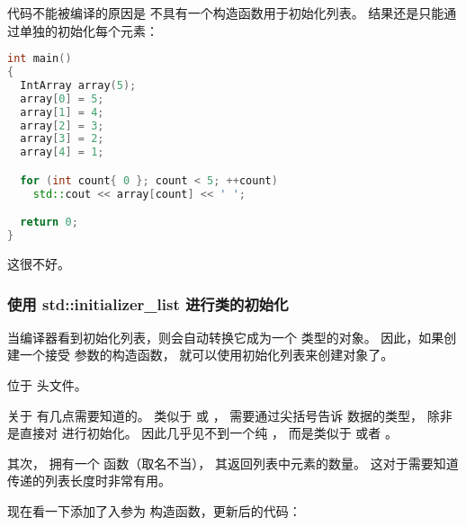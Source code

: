 \documentclass[../../LearnCpp.tex]{subfiles}
\begin{document}
代码不能被编译的原因是  不具有一个构造函数用于初始化列表。
结果还是只能通过单独的初始化每个元素：

\begin{lstlisting}[language=C++]
int main()
{
  IntArray array(5);
  array[0] = 5;
  array[1] = 4;
  array[2] = 3;
  array[3] = 2;
  array[4] = 1;

  for (int count{ 0 }; count < 5; ++count)
    std::cout << array[count] << ' ';

  return 0;
}
\end{lstlisting}

这很不好。

\subsubsection*{使用 std::initializer\_list 进行类的初始化}

当编译器看到初始化列表，则会自动转换它成为一个  类型的对象。
因此，如果创建一个接受  参数的构造函数，
就可以使用初始化列表来创建对象了。

 位于  头文件。

关于  有几点需要知道的。
类似于  或 ，
需要通过尖括号告诉  数据的类型，
除非是直接对  进行初始化。
因此几乎见不到一个纯 ，
而是类似于  或者 。

其次， 拥有一个  函数（取名不当），
其返回列表中元素的数量。
这对于需要知道传递的列表长度时非常有用。

现在看一下添加了入参为  构造函数，更新后的代码：
\end{document}
